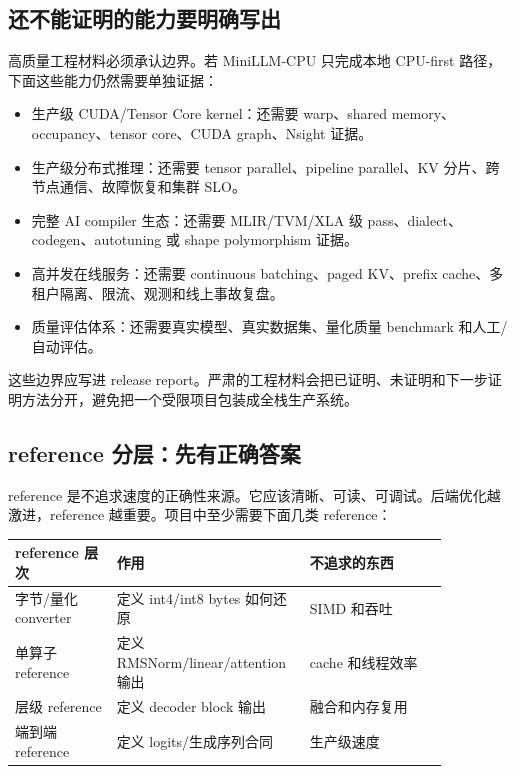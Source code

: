 \subsection{还不能证明的能力要明确写出}

高质量工程材料必须承认边界。若 MiniLLM-CPU 只完成本地 CPU-first 路径，下面这些能力仍然需要单独证据：

\begin{itemize}
  \item 生产级 CUDA/Tensor Core kernel：还需要 warp、shared memory、occupancy、tensor core、CUDA graph、Nsight 证据。
  \item 生产级分布式推理：还需要 tensor parallel、pipeline parallel、KV 分片、跨节点通信、故障恢复和集群 SLO。
  \item 完整 AI compiler 生态：还需要 MLIR/TVM/XLA 级 pass、dialect、codegen、autotuning 或 shape polymorphism 证据。
  \item 高并发在线服务：还需要 continuous batching、paged KV、prefix cache、多租户隔离、限流、观测和线上事故复盘。
  \item 质量评估体系：还需要真实模型、真实数据集、量化质量 benchmark 和人工/自动评估。
\end{itemize}

这些边界应写进 release report。严肃的工程材料会把已证明、未证明和下一步证明方法分开，避免把一个受限项目包装成全栈生产系统。

\subsection{reference 分层：先有正确答案}

reference 是不追求速度的正确性来源。它应该清晰、可读、可调试。后端优化越激进，reference 越重要。项目中至少需要下面几类 reference：

\begin{center}
\begin{tabular}{p{0.22\linewidth}p{0.34\linewidth}p{0.30\linewidth}}
\toprule
reference 层次 & 作用 & 不追求的东西 \\
\midrule
字节/量化 converter & 定义 int4/int8 bytes 如何还原 & SIMD 和吞吐 \\
单算子 reference & 定义 RMSNorm/linear/attention 输出 & cache 和线程效率 \\
层级 reference & 定义 decoder block 输出 & 融合和内存复用 \\
端到端 reference & 定义 logits/生成序列合同 & 生产级速度 \\
\bottomrule
\end{tabular}
\end{center}

